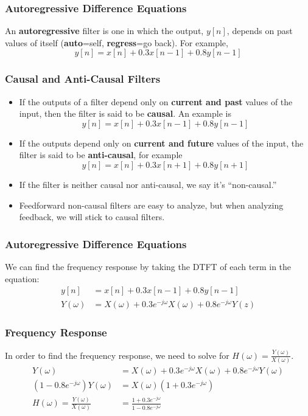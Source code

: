 \documentclass{beamer}
\begin{document}
\begin{frame}
  \frametitle{Autoregressive Difference Equations}

  An {\bf autoregressive} filter is one in which the output, $y[n]$,
  depends on past values of itself ({\bf auto}=self, {\bf
    regress}=go back).  For example,
  \[
  y[n] = x[n] + 0.3x[n-1] + 0.8 y[n-1]
  \]
  
\end{frame}

\begin{frame}
  \frametitle{Causal and Anti-Causal Filters}

  \begin{itemize}
  \item If the outputs of a filter depend only on {\bf current and
    past} values of the input, then the filter is said to be {\bf
    causal}.  An example is
    \[
    y[n] = x[n] + 0.3x[n-1] + 0.8 y[n-1]
    \]
  \item If the outputs depend only on {\bf current and future} values
    of the input, the filter is said to be {\bf anti-causal}, for example
    \[
    y[n]=x[n]+0.3x[n+1]+0.8y[n+1]
    \]
  \item If the filter is neither causal nor anti-causal, we say it's
    ``non-causal.''
  \item Feedforward non-causal filters are easy to analyze, but when
    analyzing feedback, we will stick to causal filters.
  \end{itemize}
  
\end{frame}

\begin{frame}
  \frametitle{Autoregressive Difference Equations}

  We can find the frequency response by taking the DTFT of each term
  in the equation:
  \begin{align*}
    y[n] &= x[n] + 0.3 x[n-1] +  0.8 y[n-1]\\
    Y(\omega) &= X(\omega) + 0.3e^{-j\omega}X(\omega) + 0.8  e^{-j\omega}Y(z)
  \end{align*}
  
\end{frame}

\begin{frame}
  \frametitle{Frequency Response}

  In order to find the frequency response, we need to solve for
  $H(\omega)=\frac{Y(\omega)}{X(\omega)}$.
  \begin{align*}
    Y(\omega) &= X(\omega) + 0.3e^{-j\omega}X(\omega) + 0.8 e^{-j\omega}Y(\omega)\\
    \left(1-0.8e^{-j\omega}\right)Y(\omega) &= X(\omega)(1+0.3e^{-j\omega})\\
    H(\omega) =\frac{Y(\omega)}{X(\omega)} &= \frac{1+0.3e^{-j\omega}}{1-0.8 e^{-j\omega}}
  \end{align*}
\end{frame}
\end{document}
